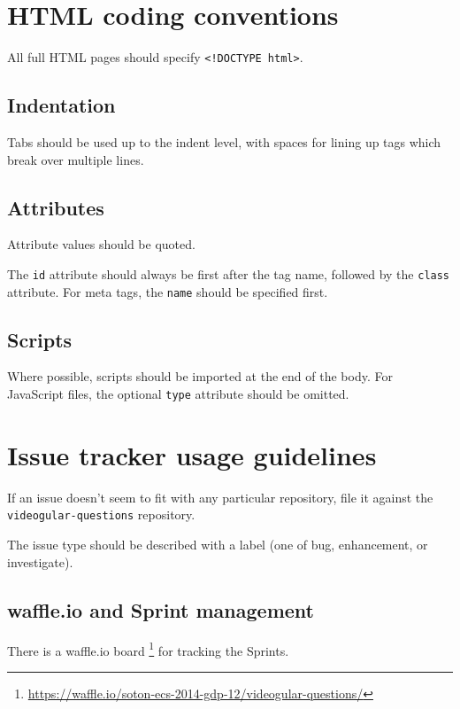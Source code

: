 \section{HTML coding conventions}

All full HTML pages should specify
\texttt{\textless{}!DOCTYPE html\textgreater{}}.

\subsection{Indentation}

Tabs should be used up to the indent level, with spaces for lining up
tags which break over multiple lines.

\subsection{Attributes}

Attribute values should be quoted.

The \texttt{id} attribute should always be first after the tag name,
followed by the \texttt{class} attribute. For meta tags, the
\texttt{name} should be specified first.

\subsection{Scripts}

Where possible, scripts should be imported at the end of the body. For
JavaScript files, the optional \texttt{type} attribute should be
omitted.

\section{Issue tracker usage guidelines}

If an issue doesn't seem to fit with any particular repository, file it
against the \texttt{videogular-questions} repository.

The issue type should be described with a label (one of bug,
enhancement, or investigate).

\subsection{waffle.io and Sprint management}

There is a waffle.io board
\footnote{\url{https://waffle.io/soton-ecs-2014-gdp-12/videogular-questions/}}
for tracking the Sprints.

